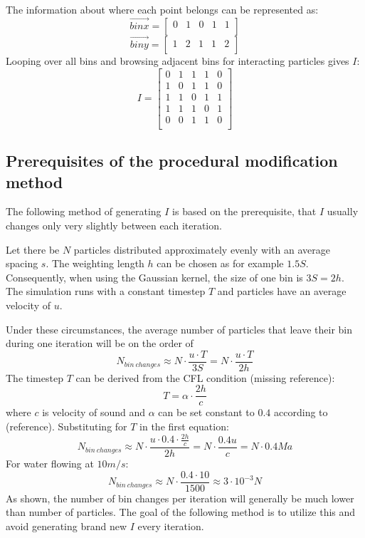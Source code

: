 \documentclass{article}
\begin{document}
The information about where each point belongs can be represented as:
$$
\Vec{binx} = 
\begin{bmatrix}
0 & 1 & 0 & 1 & 1\\
\end{bmatrix}
$$
$$
\Vec{biny} = 
\begin{bmatrix}
1 & 2 & 1 & 1 & 2\\
\end{bmatrix}
$$
Looping over all bins and browsing adjacent bins for interacting particles gives $I$:
$$
I = 
\begin{bmatrix}
0 & 1 & 1 & 1 & 0\\
1 & 0 & 1 & 1 & 0\\
1 & 1 & 0 & 1 & 1\\
1 & 1 & 1 & 0 & 1\\
0 & 0 & 1 & 1 & 0\\
\end{bmatrix}
$$

\subsection{Prerequisites of the procedural modification method}
The following method of generating $I$ is based on the prerequisite, that $I$ usually changes only very slightly between each iteration. 

Let there be $N$ particles distributed approximately evenly with an average spacing $s$. The weighting length $h$ can be chosen as for example $1.5S$. Consequently, when using the Gaussian kernel, the size of one bin is $3S=2h$. The simulation runs with a constant timestep $T$ and particles have an average velocity of $u$.

Under these circumstances, the average number of particles that leave their bin during one iteration will be on the order of
$$
N_{bin\ changes}\approx N \cdot \frac{u \cdot T}{3S} = N \cdot \frac{u \cdot T}{2h} 
$$
The timestep $T$ can be derived from the CFL condition (missing reference):
$$
T = \alpha \cdot \frac{2h}{c}
$$
where $c$ is velocity of sound and $\alpha$ can be set constant to $0.4$ according to (reference).
Substituting for $T$ in the first equation:
$$
N_{bin\ changes}\approx N \cdot \frac{u \cdot 0.4\cdot \frac{2h}{c}}{2h} = N \cdot \frac{0.4u}{c}= N \cdot 0.4Ma
$$
For water flowing at $10 m/s$:
$$
N_{bin\ changes}\approx N \cdot \frac{0.4\cdot 10}{1500}\approx 3\cdot 10^{-3} N
$$
As shown, the number of bin changes per iteration will generally be much lower than number of particles. 
The goal of the following method is to utilize this and avoid generating brand new $I$ every iteration.
\end{document}
